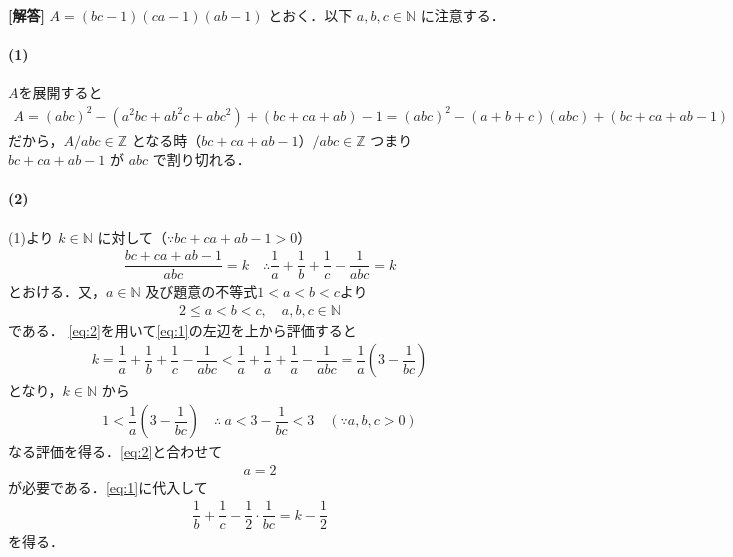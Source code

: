 \documentclass[../../main.tex]{subfiles}
\begin{document}
\begin{oframed}
  
\end{oframed}

{\bf [解答]}
$A=(bc-1)(ca-1)(ab-1)$ とおく．以下 $a,b,c\in\mathbb{N}$ に注意する．

\paragraph{(1)}
$A$を展開すると
\begin{align}
  A=(abc)^2-(a^2bc+ab^2c+abc^2)+(bc+ca+ab)-1 = (abc)^2-(a+b+c)(abc)+(bc+ca+ab-1)
\end{align}
だから，$A/abc\in\mathbb{Z}$ となる時（$bc+ca+ab-1$）$/abc\in\mathbb{Z}$ つまり $bc+ca+ab-1$ が $abc$ で割り切れる．

\paragraph{(2)}
(1)より $k\in\mathbb{N}$ に対して（$\because bc+ca+ab-1>0$）
\begin{align}
  \dfrac{bc+ca+ab-1}{abc}=k \quad \therefore \dfrac{1}{a}+\dfrac{1}{b}+\dfrac{1}{c}-\dfrac{1}{abc}=k \label{eq:1}
\end{align}
とおける．又，$a\in\mathbb{N}$ 及び題意の不等式$1<a<b<c$より
\begin{align}
  2\le a<b<c, \quad a,b,c\in\mathbb{N} \label{eq:2}
\end{align}
である．
\cref{eq:2}を用いて\cref{eq:1}の左辺を上から評価すると
\begin{align}
  k = \dfrac{1}{a}+\dfrac{1}{b}+\dfrac{1}{c}-\dfrac{1}{abc}<\dfrac{1}{a}+\dfrac{1}{a}+\dfrac{1}{a}-\dfrac{1}{abc}=\dfrac{1}{a}\left(3-\dfrac{1}{bc}\right)
\end{align}
となり，$k\in\mathbb{N}$ から
\begin{align}
  1<\dfrac{1}{a}\left(3-\dfrac{1}{bc}\right) \quad\therefore\ a<3-\dfrac{1}{bc}<3 \quad (\because a,b,c>0)
\end{align}
なる評価を得る．\cref{eq:2}と合わせて
\begin{align}
  a=2 \label{eq:3}
\end{align}
が必要である．\cref{eq:1}に代入して
\begin{align}
  \dfrac{1}{b}+\dfrac{1}{c}-\dfrac{1}{2}\cdot\dfrac{1}{bc}=k-\dfrac{1}{2} \label{eq:4}
\end{align}
を得る．
\end{document}
